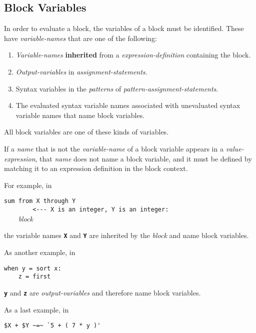 \documentclass[12pt]{article}
\newcommand{\TT}[1]{{\tt \bfseries #1}}
\newcommand{\key}[1]{{\rm \bfseries #1}}
\newenvironment{indpar}[1][0.3in]%
	{\begin{list}{}%
		     {\setlength{\itemsep}{0in}%
		      \setlength{\topsep}{0in}%
		      \setlength{\parsep}{1ex}%
		      \setlength{\labelwidth}{#1}%
		      \setlength{\leftmargin}{#1}%
		      \addtolength{\leftmargin}{\labelsep}}%
	 \item}%
	{\end{list}}
\begin{document}
\subsection{Block Variables}
\label{BLOCK-VARIABLES}

In order to evaluate a block, the variables of a block
must be identified.  These have
{\em variable-names} that are one of the following:
\begin{enumerate}
\item
{\em Variable-names} \key{inherited}
from a {\em expression-definition} containing the block.
\item
{\em Output-variables} in {\em assignment-statements}.
\item
Syntax variables in the {\em patterns} of
{\em pattern-assign\-ment-statements}.
\item
The evaluated syntax variable names associated with unevaluated syntax
variable names that name block variables.
\end{enumerate}
All block variables are one of these kinds of variables.

If a {\em name} that is not the {\em variable-name} of a block variable
appears in a {\em value-expression}, that {\em name} does not
name a block variable, and it must be
defined by matching it to an expression definition in the block context.

For example, in

\begin{indpar}[1in]
\verb|sum from X through Y| \\
\verb|        <--- X is an integer, Y is an integer:| \\
\verb|    |{\em block}
\end{indpar}

the variable names \TT{X} and \TT{Y} are inherited by the {\em block}
and name block variables.

As another example, in

\begin{indpar}[1in]\begin{verbatim}
when y = sort x:
    z = first 
\end{verbatim}\end{indpar}

\TT{y} and \TT{z} are {\em output-variables} and therefore name
block variables.

As a last example, in

\begin{indpar}[1in]\begin{verbatim}
$X + $Y ~=~ `5 + ( 7 * y )'
\end{verbatim}\end{indpar}
\end{document}
